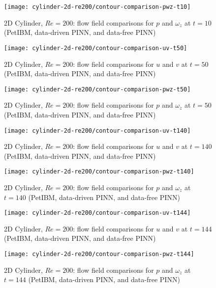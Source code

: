 \begin{figure}[hbt!]
    \texttt{[image: cylinder-2d-re200/contour-comparison-pwz-t10]}
    \caption{2D Cylinder, $Re=200$: flow field comparisons for $p$ and $\omega_z$ at $t=10$ (PetIBM, data-driven PINN, and data-free PINN)}
    \label{fig:cylinder-re200-contour-pwz-t10}
\end{figure}

\begin{figure}[hbt!]
    \texttt{[image: cylinder-2d-re200/contour-comparison-uv-t50]}
    \caption{2D Cylinder, $Re=200$: flow field comparisons for $u$ and $v$ at $t=50$ (PetIBM, data-driven PINN, and data-free PINN)}
    \label{fig:cylinder-re200-contour-uv-t50}
\end{figure}

\begin{figure}[hbt!]
    \texttt{[image: cylinder-2d-re200/contour-comparison-pwz-t50]}
    \caption{2D Cylinder, $Re=200$: flow field comparisons for $p$ and $\omega_z$ at $t=50$ (PetIBM, data-driven PINN, and data-free PINN)}
    \label{fig:cylinder-re200-contour-pwz-t50}
\end{figure}

\begin{figure}[hbt!]
    \texttt{[image: cylinder-2d-re200/contour-comparison-uv-t140]}
    \caption{2D Cylinder, $Re=200$: flow field comparisons for $u$ and $v$ at $t=140$ (PetIBM, data-driven PINN, and data-free PINN)}
    \label{fig:cylinder-re200-contour-uv-t140}
\end{figure}

\begin{figure}[hbt!]
    \texttt{[image: cylinder-2d-re200/contour-comparison-pwz-t140]}
    \caption{2D Cylinder, $Re=200$: flow field comparisons for $p$ and $\omega_z$ at $t=140$ (PetIBM, data-driven PINN, and data-free PINN)}
    \label{fig:cylinder-re200-contour-pwz-t140}
\end{figure}

\begin{figure}[hbt!]
    \texttt{[image: cylinder-2d-re200/contour-comparison-uv-t144]}
    \caption{2D Cylinder, $Re=200$: flow field comparisons for $u$ and $v$ at $t=144$ (PetIBM, data-driven PINN, and data-free PINN)}
    \label{fig:cylinder-re200-contour-uv-t144}
\end{figure}

\begin{figure}[hbt!]
    \texttt{[image: cylinder-2d-re200/contour-comparison-pwz-t144]}
    \caption{2D Cylinder, $Re=200$: flow field comparisons for $p$ and $\omega_z$ at $t=144$ (PetIBM, data-driven PINN, and data-free PINN)}
    \label{fig:cylinder-re200-contour-pwz-t144}
\end{figure}

